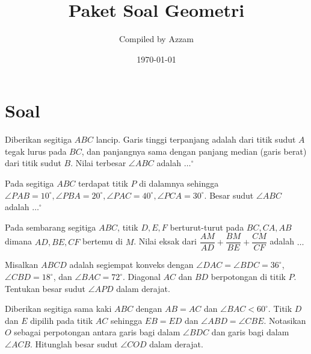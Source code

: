 \documentclass[11pt]{scrartcl}
\begin{document}
	\title{Paket Soal Geometri} %
	\date{\today}
	\author{Compiled by Azzam}
	\maketitle
	\newpage
	
	\section{Soal}

	\begin{soalbaru}
		Diberikan segitiga $ABC$ lancip. Garis tinggi terpanjang adalah dari titik sudut $A$ tegak
			lurus pada $BC$, dan panjangnya sama dengan panjang median (garis berat) dari titik sudut $B$.
			Nilai terbesar $\angle ABC$ adalah $\dots^\circ$
	\end{soalbaru}
	
	\begin{soalbaru}
		Pada segitiga $ABC$ terdapat titik $P$ di dalamnya sehingga $\angle PAB = 10^\circ, \angle PBA = 20^\circ , \angle PAC = 40^\circ, \angle PCA = 30^\circ$. Besar sudut $\angle ABC$ adalah $\dots^\circ$ 
		
	\end{soalbaru}
	
	\begin{soalbaru}
			Pada sembarang segitiga $ABC$, titik $D,E,F$ berturut-turut pada $BC,CA,AB$ dimana $AD,BE,CF$ bertemu di $M$. Nilai eksak dari $\dfrac{AM}{AD}+\dfrac{BM}{BE}+\dfrac{CM}{CF}$ adalah $\dots$
		\end{soalbaru}
	
	\begin{soalbaru}
		Misalkan $ABCD$ adalah segiempat konveks dengan $\angle DAC=\angle BDC = 36^\circ$, $\angle CBD = 18^\circ$, dan $\angle BAC = 72^\circ$. Diagonal $AC$ dan $BD$ berpotongan di titik $P$. Tentukan besar sudut $\angle APD$ dalam derajat. %
	\end{soalbaru}
	
	\begin{soalbaru}
		Diberikan segitiga sama kaki $ABC$ dengan $AB = AC$ dan $\angle BAC < 60^\circ$. Titik $D$ dan $E$ dipilih pada titik $AC$ sehingga $EB = ED$ dan $\angle ABD = \angle CBE$. Notasikan $O$ sebagai perpotongan antara garis bagi dalam $\angle BDC$ dan garis bagi dalam $\angle ACB$. Hitunglah besar sudut $\angle COD$ dalam derajat. %
	\end{soalbaru}
	
\end{document}
